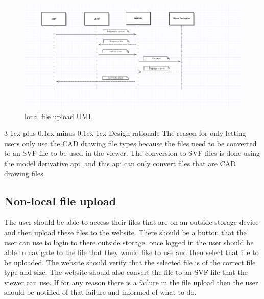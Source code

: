 \documentclass[letterpaper, 10pt, draftclsnofoot, compsoc, onecolumn]{IEEEtran}
\makeatletter
\def\subsubsection{\@startsection{subsubsection}%
                                 {3}%
                                 {\z@}%
                                 {1ex plus 0.1ex minus 0.1ex}%
                                 {1ex}%
                                 {\normalfont\normalsize}}%
\makeatother
\begin{document}
\begin{figure}
	\includegraphics[scale=0.6]{localUpload.png}
	\caption{local file upload UML}
\end{figure}

\subsubsection{Design rationale}
	The reason for only letting users only use the CAD drawing file types because the files need to be converted to an SVF file to be used in the viewer. The conversion to SVF files is done using the model derivative api, and this api can only convert files that are CAD drawing files. 

\subsection{Non-local file upload}
	The user should be able to  access their files that are on an outside storage device and then upload these files to the website. There should be a button that the user can use to login to there outside storage. once logged in the user should be able to navigate to the file that they would like to use and then select that file to be uploaded. The website should verify that the selected file is of the correct file type and size. The website should also convert the file to an SVF file that the viewer can use. If for any reason there is a failure in the file upload then the user should be notified of that failure and informed of what to do.
\end{document}
